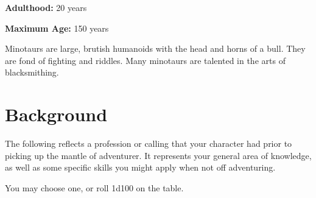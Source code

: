 \begin{multicols}{2}
\textbf{Adulthood:} 20 years

\textbf{Maximum Age:} 150 years

Minotaurs are large, brutish humanoids with the head and horns of a bull. They
are fond of fighting and riddles. Many minotaurs are talented in the arts of
blacksmithing.

\section{Background}

The following reflects a profession or calling that your character had prior
to picking up the mantle of adventurer. It represents your general area of
knowledge, as well as some specific skills you might apply when not off
adventuring.

You may choose one, or roll 1d100 on the table.


\end{multicols}
